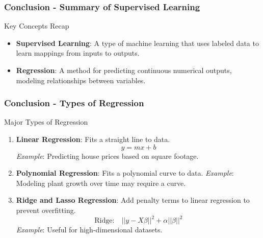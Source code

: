 \documentclass[aspectratio=169]{beamer}
\begin{document}
\begin{frame}[fragile]
    \frametitle{Conclusion - Summary of Supervised Learning}
    \begin{block}{Key Concepts Recap}
        \begin{itemize}
            \item \textbf{Supervised Learning}: A type of machine learning that uses labeled data to learn mappings from inputs to outputs.
            \item \textbf{Regression}: A method for predicting continuous numerical outputs, modeling relationships between variables.
        \end{itemize}
    \end{block}
\end{frame}

\begin{frame}[fragile]
    \frametitle{Conclusion - Types of Regression}
    \begin{block}{Major Types of Regression}
        \begin{enumerate}
            \item \textbf{Linear Regression}: Fits a straight line to data. 
                \begin{equation}
                    y = mx + b
                \end{equation}
                \textit{Example}: Predicting house prices based on square footage.
            \item \textbf{Polynomial Regression}: Fits a polynomial curve to data.
                \textit{Example}: Modeling plant growth over time may require a curve.
            \item \textbf{Ridge and Lasso Regression}: Add penalty terms to linear regression to prevent overfitting.
                \begin{equation}
                    \text{Ridge:} \quad ||y - X\beta||^2 + \alpha||\beta||^2
                \end{equation}
                \textit{Example}: Useful for high-dimensional datasets.
        \end{enumerate}
    \end{block}
\end{frame}
\end{document}
